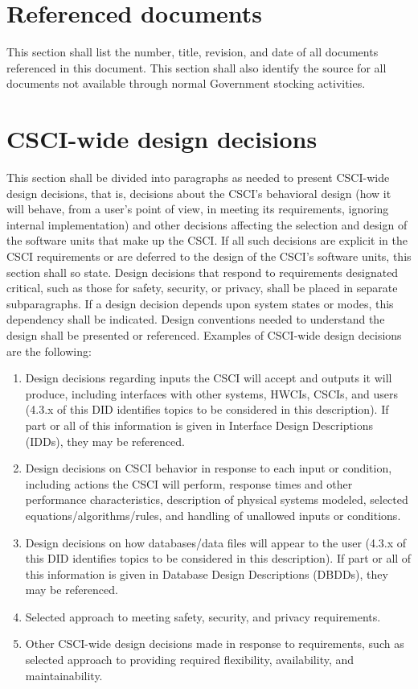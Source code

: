 \documentclass{fidata-report-template}
\begin{document}
\section{Referenced documents}

This section shall list the number, title, revision, and date of all
documents referenced in this document. This section shall also identify
the source for all documents not available through normal Government
stocking activities.

\section{CSCI-wide design decisions}

This section shall be divided into paragraphs as needed to present
CSCI-wide design decisions, that is, decisions about the CSCI's
behavioral design (how it will behave, from a user's point of view, in
meeting its requirements, ignoring internal implementation) and other
decisions affecting the selection and design of the software units that
make up the CSCI. If all such decisions are explicit in the CSCI
requirements or are deferred to the design of the CSCI's software units,
this section shall so state. Design decisions that respond to
requirements designated critical, such as those for safety, security, or
privacy, shall be placed in separate subparagraphs. If a design decision
depends upon system states or modes, this dependency shall be indicated.
Design conventions needed to understand the design shall be presented or
referenced. Examples of CSCI-wide design decisions are the following:

\begin{enumerate}
\itemsep1pt\parskip0pt
\item
  Design decisions regarding inputs the CSCI will accept and outputs it
  will produce, including interfaces with other systems, HWCIs, CSCIs,
  and users (4.3.x of this DID identifies topics to be considered in
  this description). If part or all of this information is given in
  Interface Design Descriptions (IDDs), they may be referenced.
\item
  Design decisions on CSCI behavior in response to each input or
  condition, including actions the CSCI will perform, response times and
  other performance characteristics, description of physical systems
  modeled, selected equations/algorithms/rules, and handling of
  unallowed inputs or conditions.
\item
  Design decisions on how databases/data files will appear to the user
  (4.3.x of this DID identifies topics to be considered in this
  description). If part or all of this information is given in Database
  Design Descriptions (DBDDs), they may be referenced.
\item
  Selected approach to meeting safety, security, and privacy
  requirements.
\item
  Other CSCI-wide design decisions made in response to requirements,
  such as selected approach to providing required flexibility,
  availability, and maintainability.
\end{enumerate}
\end{document}

